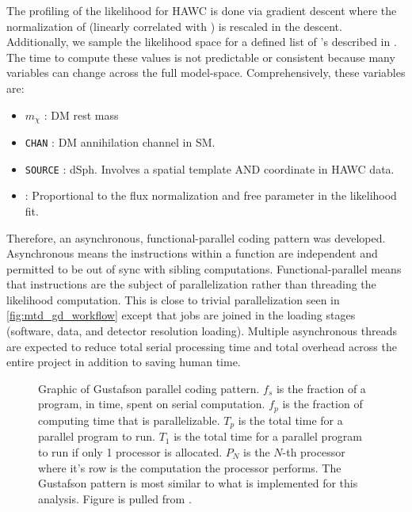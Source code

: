 The profiling of the likelihood for HAWC is done via gradient descent where the normalization of  (linearly correlated with \sv) is rescaled in the descent.
Additionally, we sample the likelihood space for a defined list of \sv's described in .
The time to compute these values is not predictable or consistent because many variables can change across the full model-space.
Comprehensively, these variables are:
\begin{itemize}
    \item $m_\chi$ : DM rest mass
    \item \texttt{CHAN} : DM annihilation channel in SM.
    \item \texttt{SOURCE} : dSph. Involves a spatial template AND coordinate in HAWC data.
    \item \sv: Proportional to the flux normalization and free parameter in the likelihood fit.
\end{itemize}
Therefore, an asynchronous, functional-parallel coding pattern was developed.
Asynchronous means the instructions within a function are independent and permitted to be out of sync with sibling computations.
Functional-parallel means that instructions are the subject of parallelization rather than threading the likelihood computation.
This is close to trivial parallelization seen in \cref{fig:mtd_gd_workflow} except that jobs are joined in the loading stages (software, data, and detector resolution loading).
Multiple asynchronous threads are expected to reduce total serial processing time and total overhead across the entire project in addition to saving human time.

\begin{figure}[h]
    \caption{Graphic of Gustafson parallel coding pattern. $f_s$ is the fraction of a program, in time, spent on serial computation. $f_p$ is the fraction of computing time that is parallelizable. $T_p$ is the total time for a parallel program to run. $T_1$ is the total time for a parallel program to run if only 1 processor is allocated. $P_N$ is the $N$-th processor where it's row is the computation the processor performs. The Gustafson pattern is most similar to what is implemented for this analysis. Figure is pulled from \cite{ArtofHPC}.}
    \label{fig:mtd_gufsta}
\end{figure}


